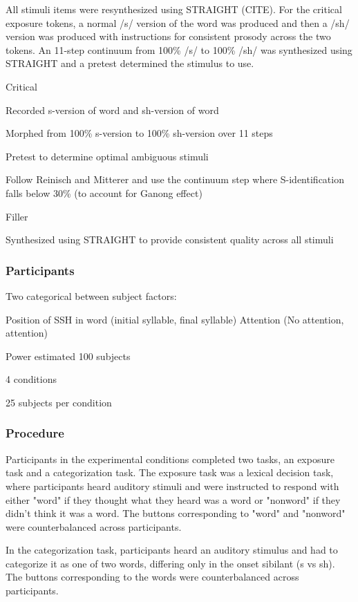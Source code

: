 
All stimuli items were resynthesized using STRAIGHT (CITE).  For the critical exposure tokens, a normal /s/ version of the word was produced and then a /sh/ version was produced with instructions for consistent prosody across the two tokens.  An 11-step continuum from 100\% /s/ to 100\% /sh/ was synthesized using STRAIGHT and a pretest determined the stimulus to use.

Critical

	Recorded s-version of word and sh-version of word

	Morphed from 100\% s-version to 100\% sh-version over 11 steps

	Pretest to determine optimal ambiguous stimuli

	Follow Reinisch and Mitterer and use the continuum step where S-identification falls below 30\% (to account for Ganong effect)

Filler

	Synthesized using STRAIGHT to provide consistent quality across all stimuli

\subsubsection{Participants}

Two categorical between subject factors:

	Position of SSH in word (initial syllable, final syllable)
	Attention (No attention, attention)

Power estimated 100 subjects

4 conditions

25 subjects per condition

\subsubsection{Procedure}

Participants in the experimental conditions completed two tasks, an exposure task and a categorization task.  The exposure task was a lexical decision task, where participants heard auditory stimuli and were instructed to respond with either "word" if they thought what they heard was a word or "nonword" if they didn't think it was a word.  The buttons corresponding to "word" and "nonword" were counterbalanced across participants.

In the categorization task, participants heard an auditory stimulus and had to categorize it as one of two words, differing only in the onset sibilant (s vs sh).  The buttons corresponding to the words were counterbalanced across participants.

